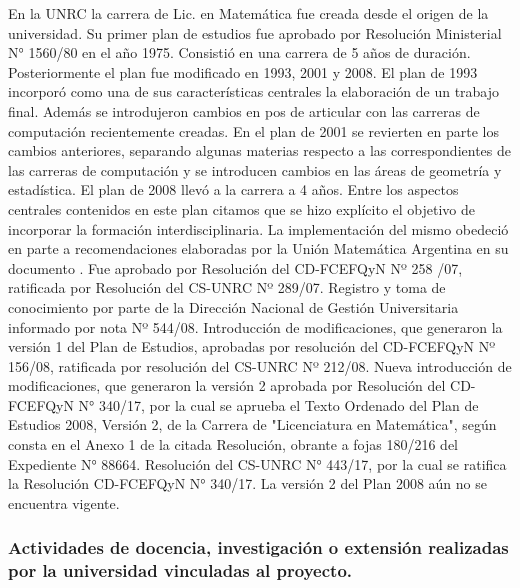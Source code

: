 \documentclass[a4paper, 12pt]{article}
\begin{document}
 En la UNRC la carrera de Lic. en Matemática fue creada desde el origen de la universidad. Su primer plan de estudios fue aprobado por Resolución Ministerial  N° 1560/80 en el año 1975. Consistió en una carrera de 5 años de duración. Posteriormente el plan fue modificado en 1993, 2001 y 2008. El plan de 1993 incorporó como una de sus características centrales la elaboración de un trabajo final. Además se introdujeron cambios en pos de articular con las carreras de computación recientemente creadas.  En el plan de 2001 se revierten en parte los cambios anteriores, separando algunas  materias respecto a las correspondientes de las carreras de  computación y se introducen cambios en las áreas de geometría y estadística.  
 El plan de  2008 llevó a la carrera a 4 años. Entre los aspectos centrales contenidos en este plan citamos que se hizo explícito el objetivo de incorporar la formación interdisciplinaria. La implementación del mismo obedeció en parte a recomendaciones elaboradas por la Unión Matemática Argentina en su documento \cite{uma}.  Fue aprobado por Resolución del CD-FCEFQyN Nº 258 /07, ratificada 
por Resolución del CS-UNRC Nº 289/07. Registro y toma de conocimiento 
por parte de la Dirección Nacional de Gestión Universitaria informado por nota 
Nº 544/08. Introducción de modificaciones, que generaron la versión 1 del Plan 
de Estudios, aprobadas por resolución del CD-FCEFQyN Nº 156/08, 
ratificada por resolución del CS-UNRC Nº 212/08.  Nueva introducción de modificaciones, que generaron la versión 2 aprobada por Resolución del CD-FCEFQyN N° 340/17, por la cual se aprueba el Texto Ordenado del Plan de Estudios 2008, Versión 2, de la Carrera de "Licenciatura en Matemática", según consta en el Anexo 1 de la citada Resolución, obrante a fojas 180/216 del Expediente N° 88664.  Resolución del CS-UNRC N° 443/17, por la cual se ratifica la Resolución  CD-FCEFQyN N° 340/17.  La versión 2 del Plan 2008 aún no se encuentra vigente. 




\subsubsection{Actividades de docencia, investigación o extensión realizadas por la universidad vinculadas  al proyecto.}
\end{document}
